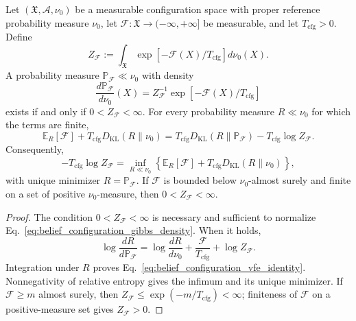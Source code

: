 \begin{theorem}
\label{thm:belief_configuration_gibbs_lift}
Let $(\mathfrak{X},\mathcal{A},\nu_0)$ be a measurable configuration space with proper reference probability measure $\nu_0$, let $\mathcal{F}:\mathfrak{X}\to(-\infty,+\infty]$ be measurable, and let $T_{\mathrm{cfg}}>0$. Define
\begin{equation}
Z_{\mathcal{F}}
:=\int_{\mathfrak{X}}
\exp[-\mathcal{F}(X)/T_{\mathrm{cfg}}]d\nu_0(X).
\label{eq:belief_configuration_partition}
\end{equation}
A probability measure $\mathbb{P}_{\mathcal{F}}\ll\nu_0$ with density
\begin{equation}
\frac{d\mathbb{P}_{\mathcal{F}}}{d\nu_0}(X)
=Z_{\mathcal{F}}^{-1}
\exp[-\mathcal{F}(X)/T_{\mathrm{cfg}}]
\label{eq:belief_configuration_gibbs_density}
\end{equation}
exists if and only if $0<Z_{\mathcal{F}}<\infty$. For every probability measure $R\ll\nu_0$ for which the terms are finite,
\begin{equation}
\mathbb{E}_{R}[\mathcal{F}]
+T_{\mathrm{cfg}}D_{\mathrm{KL}}(R\|\nu_0)
=T_{\mathrm{cfg}}D_{\mathrm{KL}}(R\|\mathbb{P}_{\mathcal{F}})
-T_{\mathrm{cfg}}\log Z_{\mathcal{F}}.
\label{eq:belief_configuration_vfe_identity}
\end{equation}
Consequently,
\begin{equation}
-T_{\mathrm{cfg}}\log Z_{\mathcal{F}}
=\inf_{R\ll\nu_0}
\left\{
\mathbb{E}_{R}[\mathcal{F}]
+T_{\mathrm{cfg}}D_{\mathrm{KL}}(R\|\nu_0)
\right\},
\label{eq:belief_configuration_gibbs_variational_principle}
\end{equation}
with unique minimizer $R=\mathbb{P}_{\mathcal{F}}$. If $\mathcal{F}$ is bounded below $\nu_0$-almost surely and finite on a set of positive $\nu_0$-measure, then $0<Z_{\mathcal{F}}<\infty$.
\end{theorem}

\begin{proof}
The condition $0<Z_{\mathcal{F}}<\infty$ is necessary and sufficient to normalize Eq.~\eqref{eq:belief_configuration_gibbs_density}. When it holds,
\begin{equation}
\log\frac{dR}{d\mathbb{P}_{\mathcal{F}}}
=\log\frac{dR}{d\nu_0}
+\frac{\mathcal{F}}{T_{\mathrm{cfg}}}
+\log Z_{\mathcal{F}}.
\label{eq:gibbs_lift_radon_nikodym_identity}
\end{equation}
Integration under $R$ proves Eq.~\eqref{eq:belief_configuration_vfe_identity}. Nonnegativity of relative entropy gives the infimum and its unique minimizer. If $\mathcal{F}\ge m$ almost surely, then $Z_{\mathcal{F}}\le\exp(-m/T_{\mathrm{cfg}})<\infty$; finiteness of $\mathcal{F}$ on a positive-measure set gives $Z_{\mathcal{F}}>0$.
\end{proof}

